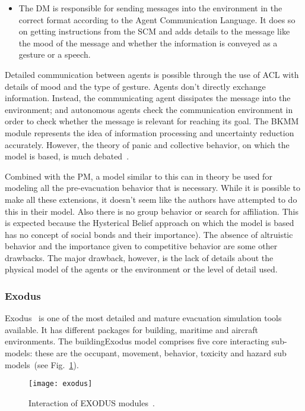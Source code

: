 \begin{itemize}
\item
The DM is responsible for sending messages into the environment in the correct format according to the Agent Communication Language. It does so on getting instructions from the SCM and adds details to the message like the mood of the message and whether the information is conveyed as a gesture or a speech.
\end{itemize}

Detailed communication between agents is possible through the use of ACL with details of mood and the type of gesture. Agents don't directly exchange information. Instead, the communicating agent dissipates the message into the environment; and autonomous agents check the communication environment in order to check whether the message is relevant for reaching its goal. The BKMM module represents the idea of information processing and uncertainty reduction accurately. However, the theory of panic and collective behavior, on which the model is based, is much debated~\cite{Torres:2010tj, Sime:1995uu}.

Combined with the PM, a model similar to this can in theory be used for modeling all the pre-evacuation behavior that is necessary. While it is possible to make all these extensions, it doesn't seem like the authors have attempted to do this in their model. Also there is no group behavior or search for affiliation. This is expected because the Hysterical Belief approach on which the model is based has no concept of social bonds and their importance). The absence of altruistic behavior and the importance given to competitive behavior are some other drawbacks. The major drawback, however, is the lack of details about the physical model of the agents or the environment or the level of detail used.

\subsubsection{Exodus}

Exodus~\cite{Owen:1996jh} is one of the most detailed and mature evacuation simulation tools available. It has different packages for building, maritime and aircraft environments. The buildingExodus model comprises five core interacting sub-models: these are the occupant, movement, behavior, toxicity and hazard sub models~(see Fig.~\ref{fig:ExodusDiagram}).

\begin{figure}[!htb]
\centering
\texttt{[image: exodus]}
\caption[EXODUS model]{Interaction of EXODUS modules~\cite{Gwynne:2001te}.}
\label{fig:ExodusDiagram}
\end{figure}


